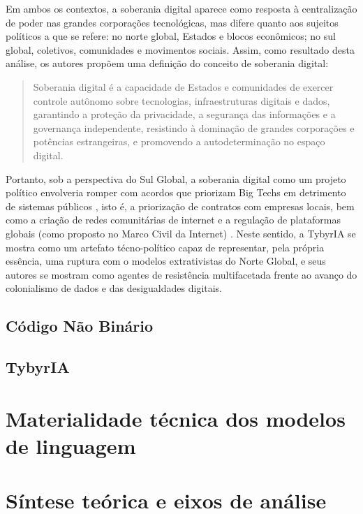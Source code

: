 Em ambos os contextos, a soberania digital aparece como resposta à centralização de poder nas grandes corporações tecnológicas, mas difere quanto aos sujeitos políticos a que se refere: no norte global, Estados e blocos econômicos; no sul global, coletivos, comunidades e movimentos sociais. Assim, como resultado desta análise, os autores propõem uma definição do conceito de soberania digital:

\begin{quote}
Soberania digital é a capacidade de Estados e comunidades de exercer controle autônomo sobre tecnologias, infraestruturas digitais e dados, garantindo a proteção da privacidade, a segurança das informações e a governança independente, resistindo à dominação de grandes corporações e potências estrangeiras, e promovendo a autodeterminação no espaço digital. \cite{lemos2024}
\end{quote}

Portanto, sob a perspectiva do Sul Global, a soberania digital como um projeto político envolveria romper com acordos que priorizam Big Techs em detrimento de sistemas públicos \cite{Souza2024}, isto é, a priorização de contratos com empresas locais, bem como a criação de redes comunitárias de internet e a regulação de plataformas globais (como proposto no Marco Civil da Internet) \cite{silveira-demcodigos}. Neste sentido, a TybyrIA se mostra como um artefato técno-político capaz de representar, pela própria essência, uma ruptura com o modelos extrativistas do Norte Global, e seus autores se mostram como agentes de resistência multifacetada frente ao avanço do colonialismo de dados e das desigualdades digitais.


\subsection{Código Não Binário}
\label{subsec:cnb}

\subsection{TybyrIA }
\label{subsec:tybyria}

\section{Materialidade técnica dos modelos de linguagem}
\label{sec:materialidade-tecnica-modelos-linguagem}


\section{Síntese teórica e eixos de análise}
\label{sec:sintese-teorica}

